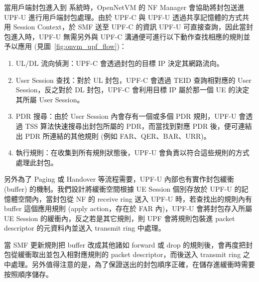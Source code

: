 當用戶端封包進入到 \LHCN 系統時，OpenNetVM 的 NF Manager 會協助將封包送進 UPF-U 進行用戶端封包處理。由於 UPF-C 與 UPF-U 透過共享記憶體的方式共用 Session Context，於 SMF 送至 UPF-C 的資訊 UPF-U 可直接查詢，因此當封包進入時，UPF-U 無需另外與 UPF-C 溝通便可進行以下動作查找相應的規則並予以應用 (見圖~\ref{fig:onvm_upf_flow})：

\begin{enumerate}
\item UL/DL 流向偵測：UPF-C 會透過封包的目標 IP 決定其網路流向。
\item User Session 查找：對於 UL 封包，UPF-C 會透過 TEID 查詢相對應的 User Session，反之對於 DL 封包，UPF-C 會利用目標 IP 屬於那一個 UE 的決定其所屬 User Session。
\item PDR 搜尋：由於 User Session 內會存有一個或多個 PDR 規則，UPF-U 會透過 TSS 算法快速搜尋出封包所屬的 PDR，而當找到對應 PDR 後，便可連結出 PDR 所連結的其他規則 (例如 FAR、QER、BAR、URR)。
\item 執行規則：在收集到所有規則狀態後，UPF-U 會負責以符合這些規則的方式處理此封包。
\end{enumerate}

另外為了 Paging 或 Handover 等流程需要，UPF-U 內部也有實作封包緩衝 (buffer) 的機制。我們設計將緩衝空間根據 UE Session 個別存放於 UPF-U 的記憶體空間內，當封包從 NF 的 receive ring 送入 UPF-U 時，若查找出的規則內有 buffer 這個應用規則 (apply action，存在於 FAR 內)，UPF-U 會將封包存入所屬 UE Session 的緩衝內，反之若是其它規則，則 UPF 會將規則包裝進 packet descriptor 的元資料內並送入 transmit ring 中處理。

當 SMF 更新規則把 buffer 改成其他諸如 forward 或 drop 的規則後，會再度把封包從緩衝取出並包入相對應規則的 packet descriptor，而後送入 transmit ring 之中處理。另外值得注意的是，為了保證送出的封包順序正確，在儲存進緩衝時需要按照順序儲存。


